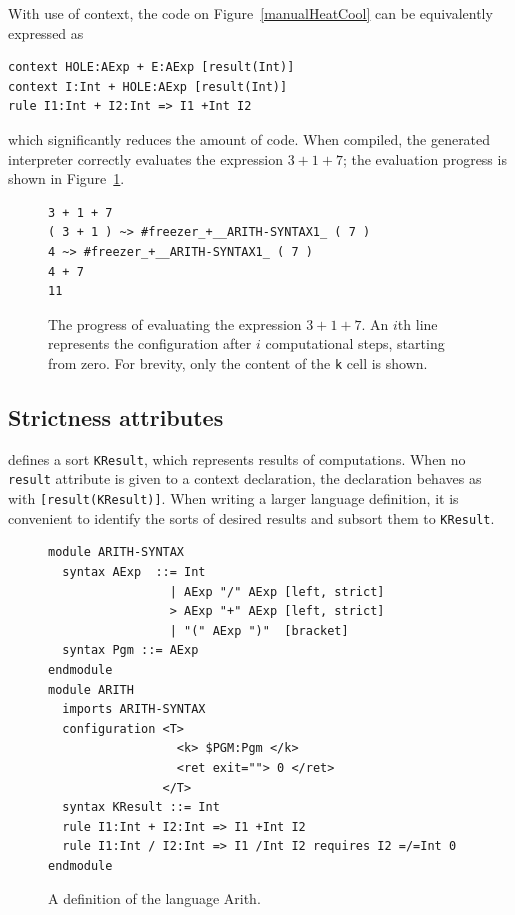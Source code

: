 \documentclass[nolot,nolof,nocover,printed]{fithesis3}
\begin{document}
With use of context, the code on Figure~\ref{manualHeatCool} can be equivalently expressed as
\begin{lstlisting}
context HOLE:AExp + E:AExp [result(Int)]
context I:Int + HOLE:AExp [result(Int)]
rule I1:Int + I2:Int => I1 +Int I2
\end{lstlisting}
which significantly reduces the amount of code. When compiled, the generated interpreter correctly evaluates the expression $3 + 1 + 7$; the evaluation progress is shown in Figure~\ref{contextEvaluation}.

\begin{figure}
\begin{lstlisting}
3 + 1 + 7
( 3 + 1 ) ~> #freezer_+__ARITH-SYNTAX1_ ( 7 )
4 ~> #freezer_+__ARITH-SYNTAX1_ ( 7 )
4 + 7
11
\end{lstlisting}
\caption{The progress of evaluating the expression $3 + 1 + 7$. An $i$th line represents the configuration after $i$ computational steps, starting from zero. For brevity, only the content of the \texttt{k} cell is shown.}
\label{contextEvaluation}
\end{figure}

\subsection{Strictness attributes}
\K defines a sort \texttt{KResult}, which represents results of computations. When no \texttt{result} attribute is given to a context declaration, the declaration behaves as with \lstinline|[result(KResult)]|. When writing a larger language definition, it is convenient to identify the sorts of desired results and subsort them to \texttt{KResult}.

\begin{figure}
\begin{lstlisting}
module ARITH-SYNTAX
  syntax AExp  ::= Int
                 | AExp "/" AExp [left, strict]
                 > AExp "+" AExp [left, strict]
                 | "(" AExp ")"  [bracket]
  syntax Pgm ::= AExp
endmodule
module ARITH
  imports ARITH-SYNTAX
  configuration <T>
                  <k> $PGM:Pgm </k>
                  <ret exit=""> 0 </ret>
                </T>
  syntax KResult ::= Int
  rule I1:Int + I2:Int => I1 +Int I2
  rule I1:Int / I2:Int => I1 /Int I2 requires I2 =/=Int 0
endmodule
\end{lstlisting}
\caption{A definition of the language Arith.}
\label{arithFinal}
\end{figure}
\end{document}
